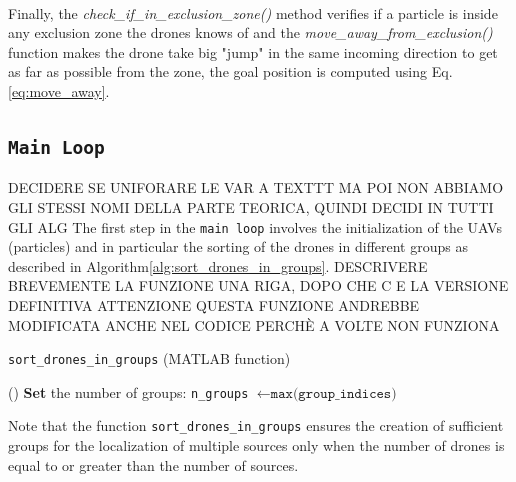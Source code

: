 \noindent\\
Finally, the
\textit{check\_if\_in\_exclusion\_zone()} 
method verifies if a particle is inside any 
exclusion zone the drones knows of and  
the \textit{move\_away\_from\_exclusion()} function
makes the drone take  big "jump" in the same incoming direction
to get as far as possible from the zone, the goal 
position is computed using Eq.\ref{eq:move_away}.

\subsection{\texttt{Main Loop}}
DECIDERE SE UNIFORARE LE VAR A TEXTTT MA POI NON ABBIAMO GLI 
STESSI NOMI DELLA PARTE TEORICA, QUINDI DECIDI IN TUTTI GLI ALG
The first step in the \texttt{main loop} involves the initialization
of the UAVs (particles) and in particular the sorting of 
the drones in different groups as described in Algorithm\ref{alg:sort_drones_in_groups}.
DESCRIVERE BREVEMENTE LA FUNZIONE UNA RIGA, DOPO CHE C E LA VERSIONE DEFINITIVA
ATTENZIONE QUESTA FUNZIONE ANDREBBE MODIFICATA ANCHE NEL CODICE
PERCH\`E A VOLTE NON FUNZIONA
\begin{algorithm}[h]
    \caption{\texttt{sort\_drones\_in\_groups} (MATLAB function)}\label{alg:sort_drones_in_groups}
    \vspace{0.3\baselineskip}
    \nonl \Fn(\tcc*[h]{}){}{
    \SetAlgoBlockMarkers{}{}
    \textbf{Set} the number of groups: \texttt{n\_groups} $\gets \texttt{max(group\_indices)}$\;
    }
\end{algorithm}

\noindent Note that the function \texttt{sort\_drones\_in\_groups} ensures the creation of sufficient groups 
for the localization of multiple sources only when the number of drones is equal to or greater than 
the number of sources.

